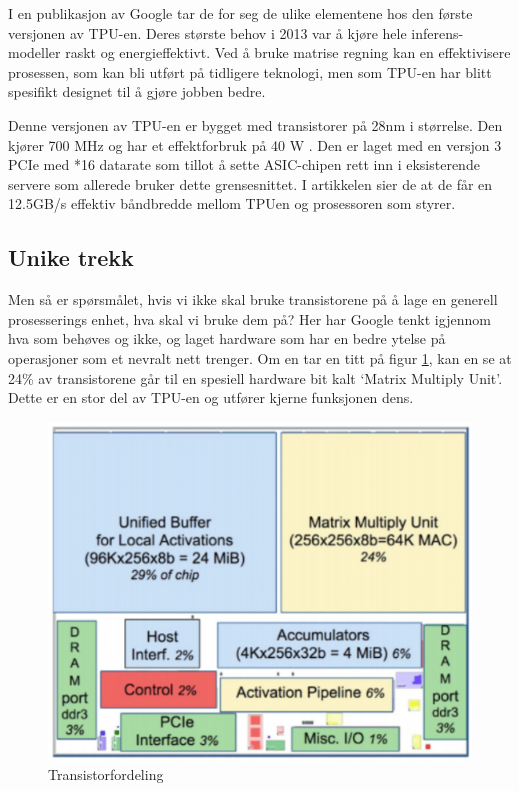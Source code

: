 I en publikasjon av Google \cite{tpu_main} tar de for seg de ulike elementene hos den første versjonen av TPU-en. Deres største behov i 2013 var å kjøre hele inferens-modeller raskt og energieffektivt. Ved å bruke matrise regning kan en effektivisere prosessen, som kan bli utført på tidligere teknologi, men som TPU-en har blitt spesifikt designet til å gjøre jobben bedre.

Denne versjonen av TPU-en er bygget med transistorer på 28nm i størrelse. Den kjører 700 MHz og har et effektforbruk på 40 W \cite{tpu_main}. Den er laget med en versjon 3 PCIe med *16 datarate som tillot å sette ASIC-chipen rett inn i eksisterende servere som allerede bruker dette grensesnittet. I artikkelen sier de at de får en 12.5GB/s effektiv båndbredde mellom TPUen og prosessoren som styrer.
 
\subsection{Unike trekk}
Men så er spørsmålet, hvis vi ikke skal bruke transistorene på å lage en generell prosesserings enhet, hva skal vi bruke dem på? Her har Google tenkt igjennom hva som behøves og ikke, og laget hardware som har en bedre ytelse på operasjoner som et nevralt nett trenger. Om en tar en titt på figur \ref{fig:transistor}, kan en se at 24\% av transistorene går til en spesiell hardware bit kalt ‘Matrix Multiply Unit’. Dette er en stor del av TPU-en og utfører kjerne funksjonen dens.

\begin{figure}[ht]
    \centering
    \includegraphics[width=\textwidth]{tpu_transistor_fordeling.jpg}
    \caption{Transistorfordeling}
    \label{fig:transistor}
\end{figure}
 
